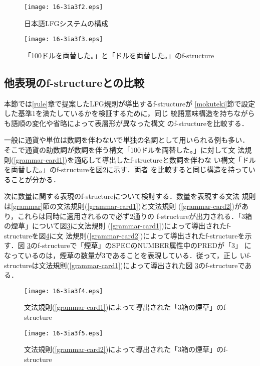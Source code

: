 \documentclass[japanese]{jnlp_1.4}
\begin{document}
\begin{figure}[t]
\begin{center}
\texttt{[image: 16-3ia3f2.eps]}
\end{center}
\caption{日本語LFGシステムの構成}
\label{kousei}
\end{figure}
\begin{figure}[t]
\begin{center}
\texttt{[image: 16-3ia3f3.eps]}
\end{center}
\caption{「100ドルを両替した。」と「ドルを両替した。」のf-structure}
\label{currency}
\end{figure}



\subsection{他表現のf-structureとの比較\label{fstr-j}}
本節では\ref{rule}章で提案したLFG規則が導出するf-structureが
\ref{mokuteki}節で設定した基準1を満たしているかを検証するために，同じ
統語意味構造を持ちながらも語順の変化や省略によって表層形が異なった構文
のf-structureを比較する．

一般に通貨や単位は数詞を伴わないで単独の名詞として用いられる例も多い．
そこで通貨の助数詞が数詞を伴う構文「100ドルを両替した。」に対して文
法規則(\ref{grammar-card1})を適応して導出したf-structureと数詞を伴わな
い構文「ドルを両替した。」のf-structureを図\ref{currency}に示す．両者
を比較すると同じ構造を持っていることが分かる．

次に数量に関する表現のf-structureについて検討する．数量を表現する文法
規則は\ref{grammar}節の文法規則(\ref{grammar-card1})と文法規則
(\ref{grammar-card2})があり，これらは同時に適用されるので必ず2通りの
f-structureが出力される．「3箱の煙草」について図\ref{3box-a}に文法規則
(\ref{grammar-card1})によって導出されたf-structureを図\ref{3box-b}に文
法規則(\ref{grammar-card2})によって導出されたf-structureを示す．図
\ref{3box-a}のf-structureで「煙草」のSPECのNUMBER属性中のPREDが「3」
になっているのは，煙草の数量が3であることを表現している．従って，正し
いf-structureは文法規則(\ref{grammar-card1})によって導出された図
\ref{3box-a}のf-structureである．

\begin{figure}[t]
\begin{center}
\texttt{[image: 16-3ia3f4.eps]}
\end{center}
\caption{文法規則(\ref{grammar-card1})によって導出された「3箱の煙草」のf-structure}
\label{3box-a}
\end{figure}
\begin{figure}[t]
\begin{center}
\texttt{[image: 16-3ia3f5.eps]}
\end{center}
\caption{文法規則(\ref{grammar-card2})によって導出された「3箱の煙草」のf-structure}
\label{3box-b}
\end{figure}
\end{document}
